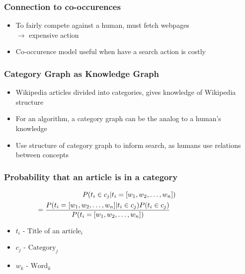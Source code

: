 \documentclass{beamer}
\begin{document}
\begin{frame}
  \frametitle{Connection to co-occurences}

\begin{itemize}
  \item To fairly compete against a human, must fetch webpages \\
    \hspace{0.3in}$\longrightarrow$ expensive action

  \item Co-occurence model useful when have a search action is costly
\end{itemize}

\end{frame}

\begin{frame}
  \frametitle{Category Graph as Knowledge Graph}
\begin{itemize}
  \item Wikipedia articles divided into categories, gives knowledge of Wikipedia
    structure
  \item For an algorithm, a category graph can be the analog to a human's
    knowledge
    
  \item Use structure of category graph to inform search, as humans use
    relations between concepts

\end{itemize}
\end{frame}

\begin{frame}
  \frametitle{Probability that an article is in a category}

\begin{multline*}
P(t_i \in c_j | t_i = [w_1, w_2, \dots, w_n]) \\
\hspace{-1in}= \frac{P(t_i = [w_1, w_2,
  \dots, w_n] | t_i \in c_j) P(t_i \in c_j)}{P(t_i = [w_1, w_2, \dots, w_n])}
\end{multline*}

\begin{itemize}
  \item $t_i$ - Title of an $\text{article}_i$
  \item $c_j$ - $\text{Category}_j$
  \item $w_k$ - $\text{Word}_k$
\end{itemize}


\end{frame}
\end{document}
